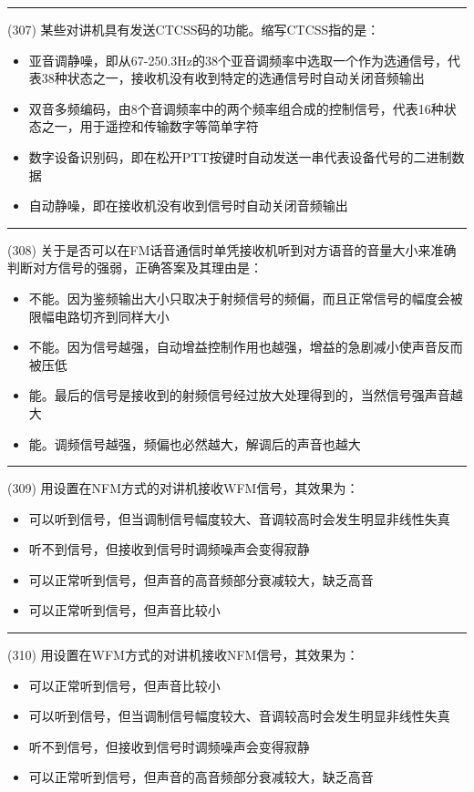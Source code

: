 \documentclass[twocolumn]{ctexart}  %
\begin{document}
\noindent\rule{0.5\textwidth}{1pt}
\heiti (307) 某些对讲机具有发送CTCSS码的功能。缩写CTCSS指的是： \songti {\color{gray} [LK0262] }
\begin{itemize}
	\item  亚音调静噪，即从67-250.3Hz的38个亚音调频率中选取一个作为选通信号，代表38种状态之一，接收机没有收到特定的选通信号时自动关闭音频输出
	\item  双音多频编码，由8个音调频率中的两个频率组合成的控制信号，代表16种状态之一，用于遥控和传输数字等简单字符
	\item  数字设备识别码，即在松开PTT按键时自动发送一串代表设备代号的二进制数据
	\item  自动静噪，即在接收机没有收到信号时自动关闭音频输出
\end{itemize}


\noindent\rule{0.5\textwidth}{1pt}
\heiti (308) 关于是否可以在FM话音通信时单凭接收机听到对方语音的音量大小来准确判断对方信号的强弱，正确答案及其理由是： \songti {\color{gray} [LK0783] }
\begin{itemize}
	\item  不能。因为鉴频输出大小只取决于射频信号的频偏，而且正常信号的幅度会被限幅电路切齐到同样大小
	\item  不能。因为信号越强，自动增益控制作用也越强，增益的急剧减小使声音反而被压低
	\item  能。最后的信号是接收到的射频信号经过放大处理得到的，当然信号强声音越大
	\item  能。调频信号越强，频偏也必然越大，解调后的声音也越大
\end{itemize}


\noindent\rule{0.5\textwidth}{1pt}
\heiti (309) 用设置在NFM方式的对讲机接收WFM信号，其效果为： \songti {\color{gray} [LK0788] }
\begin{itemize}
	\item  可以听到信号，但当调制信号幅度较大、音调较高时会发生明显非线性失真
	\item  听不到信号，但接收到信号时调频噪声会变得寂静
	\item  可以正常听到信号，但声音的高音频部分衰减较大，缺乏高音
	\item  可以正常听到信号，但声音比较小
\end{itemize}


\noindent\rule{0.5\textwidth}{1pt}
\heiti (310) 用设置在WFM方式的对讲机接收NFM信号，其效果为： \songti {\color{gray} [LK0789] }
\begin{itemize}
	\item  可以正常听到信号，但声音比较小
	\item  可以听到信号，但当调制信号幅度较大、音调较高时会发生明显非线性失真
	\item  听不到信号，但接收到信号时调频噪声会变得寂静
	\item  可以正常听到信号，但声音的高音频部分衰减较大，缺乏高音
\end{itemize}
\end{document}
